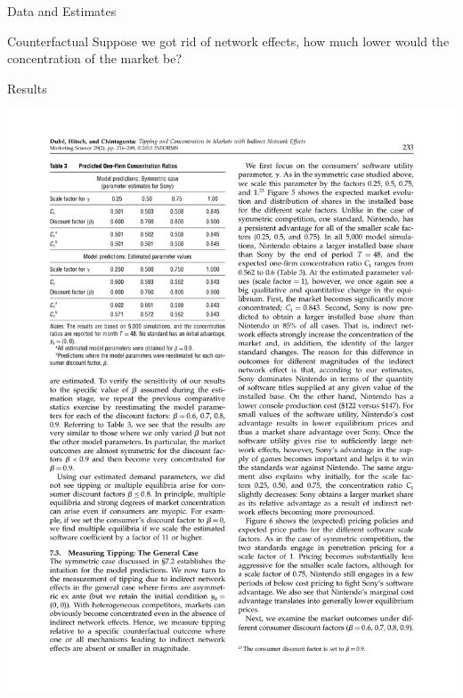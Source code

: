 \documentclass[xcolor=pdftex,dvipsnames,table,mathserif,aspectratio=169]{beamer}
\begin{document}
\begin{frame}{Data and Estimates}
\begin{center}
\end{center}
\end{frame}

\begin{frame}{Counterfactual}
Suppose we got rid of network effects, how much lower would the concentration of the market be?
\end{frame}

\begin{frame}{Results}
\begin{center}
\includegraphics[scale=0.65]{resources/dube-table3}

\end{center}
\end{frame}
\end{document}
